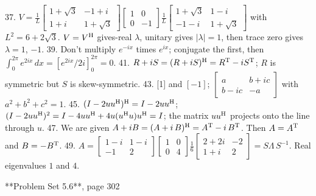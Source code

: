 37. \(V=\frac{1}{L}\left[\begin{array}{cc}1+\sqrt{3}&-1+i\\ 1+i&1+\sqrt{3}\end{array}\right]\left[\begin{array}{cc}1&0\\ 0&-1\end{array}\right]\frac{1}{L}\left[\begin{array}{cc}1+\sqrt{3}&1-i\\ -1-i&1+\sqrt{3}\end{array}\right]\) with \(L^{2}=6+2\sqrt{3}\). \(V=V^{\rm H}\) gives-real \(\lambda\), unitary gives \(|\lambda|=1\), then trace zero gives \(\lambda=1\), \(-1\).
39. Don't multiply \(e^{-ix}\) times \(e^{ix}\); conjugate the first, then \(\int_{0}^{2\pi}e^{2ix}\,dx=[e^{2ix}/2i]_{0}^{2\pi}=0\).
41. \(R+iS=(R+iS)^{\rm H}=R^{\rm T}-iS^{\rm T}\); \(R\) is symmetric but \(S\) is skew-symmetric.
43. [1] and \([-1]\); \(\left[\begin{array}{cc}a&b+ic\\ b-ic&-a\end{array}\right]\) with \(a^{2}+b^{2}+c^{2}=1\).
45. \((I-2uu^{\rm H})^{\rm H}=I-2uu^{\rm H}\); \((I-2uu^{\rm H})^{2}=I-4uu^{\rm H}+4u(u^{\rm H}u)u^{\rm H}=I\); the matrix \(uu^{\rm H}\) projects onto the line through \(u\).
47. We are given \(A+iB=(A+i\,B)^{\rm H}=A^{\rm T}-i\,B^{\rm T}\). Then \(A=A^{\rm T}\) and \(B=-B^{\rm T}\).
49. \(A=\left[\begin{array}{cc}1-i&1-i\\ -1&2\end{array}\right]\left[\begin{array}{cc}1&0\\ 0&4\end{array}\right]\frac{1}{6}\left[\begin{array}{cc}2+2i&-2\\ 1+i&2\end{array}\right]=S\Lambda\,S^{-1}\). Real eigenvalues \(1\) and \(4\).

**Problem Set 5.6**, page 302

